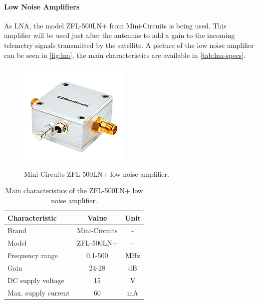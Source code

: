 \paragraph{Low Noise Amplifiers}

As LNA, the model ZFL-500LN+ from Mini-Circuits \cite{zfl500ln} is being used. This amplifier will be used just after the antennas to add a gain to the incoming telemetry signals transmitted by the satellite. A picture of the low noise amplifier can be seen in \autoref{fig:lna}, the main characteristics are available in \autoref{tab:lna-specs}.

\begin{figure}[!ht]
    \begin{center}
        \includegraphics[width=150pt]{figures/lna.png}
        \caption{Mini-Circuits ZFL-500LN+ low noise amplifier.}
        \label{fig:lna}
    \end{center}
\end{figure}

\begin{table}[ht]
    \centering
    \begin{tabular}{lcc}
        \toprule[1.5pt]
        \textbf{Characteristic} & \textbf{Value}    & \textbf{Unit} \\
        \midrule
        Brand                   & Mini-Circuits     & - \\
        Model                   & ZFL-500LN+        & - \\
        Frequency range         & 0.1-500           & MHz \\
        Gain                    & 24-28             & dB \\
        DC supply voltage       & 15                & V \\
        Max. supply current     & 60                & mA \\
        \bottomrule[1.5pt]
    \end{tabular}
    \caption{Main characteristics of the ZFL-500LN+ low noise amplifier.}
    \label{tab:lna-specs}
\end{table}

